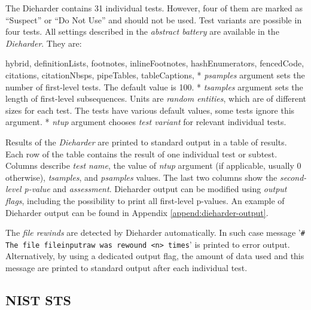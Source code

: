 \documentclass[
  digital,     %
  oneside,     %
  nosansbold,  %
  nocolorbold, %
  nolof,         %
  nolot,         %
]{fithesis4}
\begin{document}
The Dieharder contains 31 individual tests. However, four of them are marked as ``Suspect'' or ``Do Not Use'' and should not be used. Test variants are possible in four tests. All settings described in the \emph{abstract battery} are available in the \emph{Dieharder}. They are:
\begin{markdown*}{%
  hybrid,
  definitionLists,
  footnotes,
  inlineFootnotes,
  hashEnumerators,
  fencedCode,
  citations,
  citationNbsps,
  pipeTables,
  tableCaptions,
}
* \emph{psamples} argument sets the number of first-level tests. The default value is 100.
* \emph{tsamples} argument sets the length of first-level subsequences. Units are \emph{random entities}, which are of different sizes for each test. The tests have various default values, some tests ignore this argument.
* \emph{ntup} argument chooses \emph{test variant} for relevant individual tests.

\end{markdown*}

Results of the \emph{Dieharder} are printed to standard output in a table of results. Each row of the table contains the result of one individual test or subtest. Columns describe \emph{test name}, the value of \emph{ntup} argument (if applicable, usually 0 otherwise), \emph{tsamples}, and \emph{psamples} values. The last two columns show the \emph{second-level p-value} and \emph{assessment}. Dieharder output can be modified using \emph{output flags}, including the possibility to print all first-level p-values. An example of Dieharder output can be found in Appendix \ref{append:dieharder-output}.

The \emph{file rewinds} are detected by Dieharder automatically. In such case message '\texttt{\# The file file\textunderscore input\textunderscore raw was rewound <n> times}' is printed to error output. Alternatively, by using a dedicated output flag, the amount of data used and this message are printed to standard output after each individual test.

\subsection{NIST STS} \label{chap:sols-nist}
\end{document}
